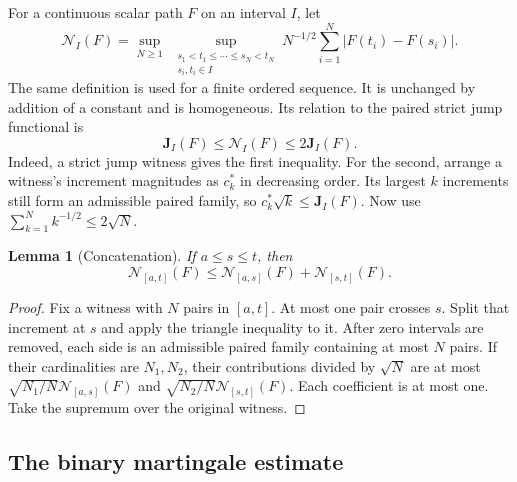 \documentclass[11pt]{article}
\numberwithin{equation}{section}
\newtheorem{lemma}[theorem]{Lemma}
\theoremstyle{remark}
\theoremstyle{definition}
\begin{document}
For a continuous scalar path $F$ on an interval $I$, let
\[
 \mathcal N_I(F)=
 \sup_{N\ge1}\ \sup_{\substack{s_1<t_1\le\cdots\le s_N<t_N\\s_i,t_i\in I}}
 N^{-1/2}\sum_{i=1}^N|F(t_i)-F(s_i)|.
\]
The same definition is used for a finite ordered sequence. It is
unchanged by addition of a constant and is homogeneous. Its relation
to the paired strict jump functional is
\begin{equation}\label{mod:martingale-NJ}
 \mathbf J_I(F)\le\mathcal N_I(F)\le2\mathbf J_I(F).
\end{equation}
Indeed, a strict jump witness gives the first inequality. For the
second, arrange a witness's increment magnitudes as $c_k^*$ in
decreasing order. Its largest $k$ increments still form an admissible
paired family, so $c_k^*\sqrt{k}\le\mathbf J_I(F)$. Now use
$\sum_{k=1}^N k^{-1/2}\le2\sqrt N$.

\begin{lemma}[Concatenation]\label{mod:martingale-concatenation}
If $a\le s\le t$, then
\begin{equation}\label{mod:martingale-concatenation-eq}
 \mathcal N_{[a,t]}(F)
 \le\mathcal N_{[a,s]}(F)+\mathcal N_{[s,t]}(F).
\end{equation}
\end{lemma}

\begin{proof}
Fix a witness with $N$ pairs in $[a,t]$. At most one pair crosses $s$.
Split that increment at $s$ and apply the triangle inequality to it.
After zero intervals are removed, each side is an admissible paired
family containing at most $N$ pairs. If their cardinalities are
$N_1,N_2$, their contributions divided by $\sqrt N$ are at most
$\sqrt{N_1/N}\mathcal N_{[a,s]}(F)$ and
$\sqrt{N_2/N}\mathcal N_{[s,t]}(F)$. Each coefficient is at most one.
Take the supremum over the original witness.
\end{proof}

\subsection{The binary martingale estimate}
\end{document}
